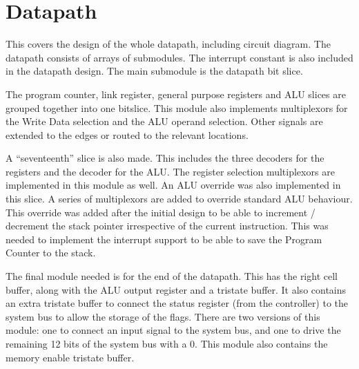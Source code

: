 

\section{Datapath}

This covers the design of the whole datapath, including circuit diagram.
The datapath consists of arrays of submodules. 
The interrupt constant is also included in the datapath design.
The main submodule is the datapath bit slice. 


The program counter, link register, general purpose registers and ALU slices are grouped together into one bitslice.
This module also implements multiplexors for the Write Data selection and the ALU operand selection.
Other signals are extended to the edges or routed to the relevant locations. 

A ``seventeenth'' slice is also made. 
This includes the three decoders for the registers and the decoder for the ALU.
The register selection multiplexors are implemented in this module as well.
An ALU override was also implemented in this slice.
A series of multiplexors are added to override standard ALU behaviour.%
This override was added after the initial design to be able to increment / decrement the stack pointer irrespective of the current instruction.
This was needed to implement the interrupt support to be able to save the Program Counter to the stack.

The final module needed is for the end of the datapath. 
This has the right cell buffer, along with the ALU output register and a tristate buffer.
It also contains an extra tristate buffer to connect the status register (from the controller) to the system bus to allow the storage of the flags.
There are two versions of this module: one to connect an input signal to the system bus, and one to drive the remaining 12 bits of the system bus with a 0. 
This module also contains the memory enable tristate buffer.

